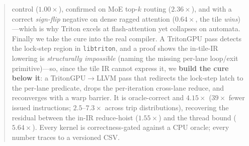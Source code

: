 \documentclass[conference]{IEEEtran}
\begin{document}
\begin{abstract}
control ($1.00\times$), confirmed on MoE top-$k$ routing ($2.36\times$), and with a correct
\emph{sign-flip} negative on dense ragged attention ($0.64\times$, the tile \emph{wins})---which is why
Triton excels at flash-attention yet collapses on automata. Finally we take the cure
into the real compiler. A TritonGPU pass detects the lock-step region in \texttt{libtriton}, and a proof
shows the in-tile-IR lowering is \emph{structurally impossible} (naming the missing per-lane loop/exit
primitive)---so, since the tile IR cannot express it, we \textbf{build the cure below it}: a
\mbox{TritonGPU$\rightarrow$LLVM} pass that redirects the lock-step latch to the per-lane predicate, drops the
per-iteration cross-lane reduce, and reconverges with a warp barrier. It is oracle-correct and
\textbf{$4.15\times$} ($39\times$ fewer issued instructions; $2.5$--$7.3\times$ across trip distributions),
recovering the residual between the in-IR reduce-hoist ($1.55\times$) and the thread bound ($5.64\times$).
Every kernel is correctness-gated against a CPU oracle; every number traces to a versioned CSV.
\end{abstract}
\end{document}
